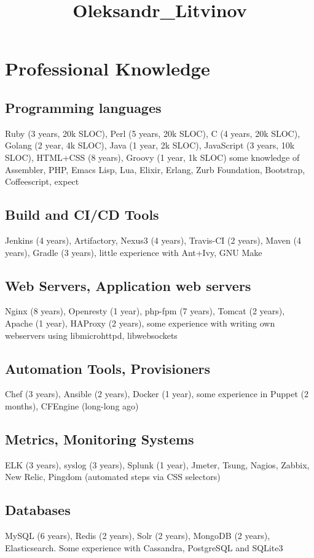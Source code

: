 \documentclass[letterpaper]{article}
\date{}
\title{Oleksandr\_Litvinov}
\renewcommand\maketitle{}
\begin{document}
\maketitle
{}

\section{Professional Knowledge}
\label{sec-1}
\subsection{Programming languages}
\label{sec-1-1}
Ruby (3 years, 20k SLOC),
Perl (5 years, 20k SLOC),
C (4 years, 20k SLOC),
Golang (2 year, 4k SLOC),
Java (1 year, 2k SLOC),
JavaScript (3 years, 10k SLOC),
HTML+CSS (8 years),
Groovy (1 year, 1k SLOC)
some knowledge of Assembler, PHP, Emacs Lisp, Lua, Elixir, Erlang, Zurb Foundation, Bootstrap, Coffeescript, expect
\subsection{Build and CI/CD Tools}
\label{sec-1-2}
Jenkins (4 years),
Artifactory, Nexus3 (4 years),
Travis-CI (2 years),
Maven (4 years),
Gradle (3 years),
little experience with Ant+Ivy, GNU Make
\subsection{Web Servers, Application web servers}
\label{sec-1-3}
Nginx (8 years),
Openresty (1 year),
php-fpm (7 years),
Tomcat (2 years),
Apache (1 year),
HAProxy (2 years),
some experience with writing own webservers using libmicrohttpd, libwebsockets
\subsection{Automation Tools, Provisioners}
\label{sec-1-4}
Chef (3 years),
Ansible (2 years),
Docker (1 year),
some experience in Puppet (2 months), CFEngine (long-long ago)
\subsection{Metrics, Monitoring Systems}
\label{sec-1-5}
ELK (3 years),
syslog (3 years),
Splunk (1 year),
Jmeter,
Tsung,
Nagios,
Zabbix,
New Relic,
Pingdom (automated steps via CSS selectors)
\subsection{Databases}
\label{sec-1-6}
MySQL (6 years),
Redis (2 years),
Solr (2 years),
MongoDB (2 years),
Elasticsearch.
Some experience with Cassandra, PostgreSQL and SQLite3
\end{document}
